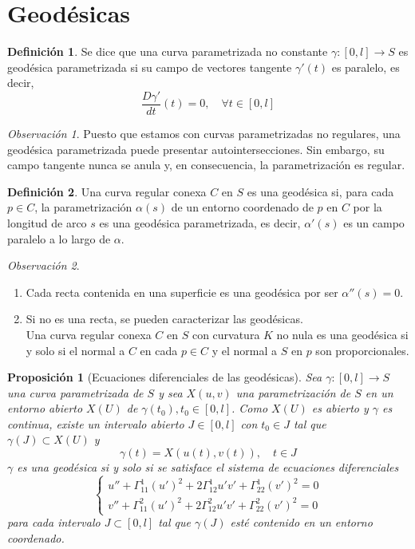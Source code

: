 \documentclass{report}
\newtheorem{proposition}[theorem]{Proposición}
\theoremstyle{remark}
\newtheorem*{remark}{Observación}
\theoremstyle{remark}
\theoremstyle{definition}
\newtheorem{definition}{Definición}[chapter]
\theoremstyle{definition}
\theoremstyle{definition}
\begin{document}
\section{Geodésicas}

\begin{definition}
    Se dice que una curva parametrizada no constante $\gamma : [0, l] \to S$ es geodésica parametrizada si su campo de vectores tangente $\gamma'(t)$ es paralelo, es decir,
    $$\frac{D\gamma'}{dt}(t) = 0, \quad \forall t \in [0, l]$$
\end{definition}

\begin{remark}
    Puesto que estamos con curvas parametrizadas no regulares, una geodésica parametrizada puede presentar autointersecciones.
    Sin embargo, su campo tangente nunca se anula y, en consecuencia, la parametrización es regular.
\end{remark}

\begin{definition}
    Una curva regular conexa $C$ en $S$ es una geodésica si, para cada $p \in C$, la parametrización $\alpha(s)$ de un entorno coordenado de $p$ en $C$ por la longitud de arco $s$ es una geodésica parametrizada, es decir, $\alpha'(s)$ es un campo paralelo a lo largo de $\alpha$.
\end{definition}

\begin{remark}
    \hfill
    \begin{enumerate}
        \item Cada recta contenida en una superficie es una geodésica por ser $\alpha''(s) = 0$.
        \item Si no es una recta, se pueden caracterizar las geodésicas.\\
              Una curva regular conexa $C$ en $S$ con curvatura $K$ no nula es una geodésica si y solo si el normal a $C$ en cada $p \in C$ y el normal a $S$ en $p$ son proporcionales.
    \end{enumerate}
\end{remark}

\begin{proposition}[Ecuaciones diferenciales de las geodésicas]
    Sea $\gamma : [0, l] \to S$ una curva parametrizada de $S$ y sea $X(u, v)$ una parametrización de $S$ en un entorno abierto $X(U)$ de $\gamma(t_0), t_0 \in [0, l]$.
    Como $X(U)$ es abierto y $\gamma$ es continua, existe un intervalo abierto $J \in [0, l]$ con $t_0 \in J$ tal que $\gamma(J) \subset X(U)$ y $$\gamma(t) = X(u(t), v(t)), \quad t \in J$$
    $\gamma$ es una geodésica si y solo si se satisface el sistema de ecuaciones diferenciales
    $$\left\{ \begin{array}{lcl}
            u'' + \Gamma^1_{11}(u')^2 + 2\Gamma^1_{12}u'v' + \Gamma^1_{22}(v')^2 = 0 \\
            v'' + \Gamma^2_{11}(u')^2 + 2\Gamma^2_{12}u'v' + \Gamma^2_{22}(v')^2 = 0
        \end{array}
        \right.$$
    para cada intervalo $J \subset [0, l]$ tal que $\gamma(J)$ esté contenido en un entorno coordenado.
\end{proposition}
\end{document}
